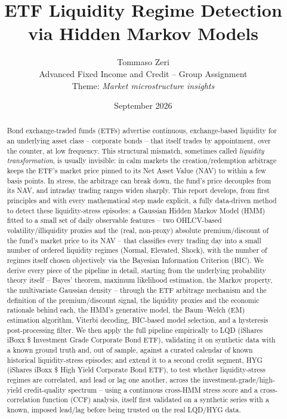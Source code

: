 \documentclass[11pt]{article}
\title{ETF Liquidity Regime Detection via Hidden Markov Models}
\author{Tommaso Zeri \\ \small Advanced Fixed Income and Credit -- Group Assignment \\ \small Theme: \emph{Market microstructure insights}}
\date{September 2026}
\theoremstyle{definition}
\theoremstyle{remark}
\begin{document}
\maketitle

\begin{abstract}
\noindent Bond exchange-traded funds (ETFs) advertise continuous, exchange-based liquidity for an underlying asset class -- corporate bonds -- that itself trades by appointment, over the counter, at low frequency. This structural mismatch, sometimes called \emph{liquidity transformation}, is usually invisible: in calm markets the creation/redemption arbitrage keeps the ETF's market price pinned to its Net Asset Value (NAV) to within a few basis points. In stress, the arbitrage can break down, the fund's price decouples from its NAV, and intraday trading ranges widen sharply. This report develops, from first principles and with every mathematical step made explicit, a fully data-driven method to detect these liquidity-stress episodes: a Gaussian Hidden Markov Model (HMM) fitted to a small set of daily observable features -- two OHLCV-based volatility/illiquidity proxies and the (real, non-proxy) absolute premium/discount of the fund's market price to its NAV -- that classifies every trading day into a small number of ordered liquidity regimes (Normal, Elevated, Shock), with the number of regimes itself chosen objectively via the Bayesian Information Criterion (BIC). We derive every piece of the pipeline in detail, starting from the underlying probability theory itself -- Bayes' theorem, maximum likelihood estimation, the Markov property, the multivariate Gaussian density -- through the ETF arbitrage mechanism and the definition of the premium/discount signal, the liquidity proxies and the economic rationale behind each, the HMM's generative model, the Baum--Welch (EM) estimation algorithm, Viterbi decoding, BIC-based model selection, and a hysteresis post-processing filter. We then apply the full pipeline empirically to LQD (iShares iBoxx \$ Investment Grade Corporate Bond ETF), validating it on synthetic data with a known ground truth and, out of sample, against a curated calendar of known historical liquidity-stress episodes; and extend it to a second credit segment, HYG (iShares iBoxx \$ High Yield Corporate Bond ETF), to test whether liquidity-stress regimes are correlated, and lead or lag one another, across the investment-grade/high-yield credit-quality spectrum -- using a continuous cross-HMM stress score and a cross-correlation function (CCF) analysis, itself first validated on a synthetic series with a known, imposed lead/lag before being trusted on the real LQD/HYG data.
\end{abstract}
\end{document}
